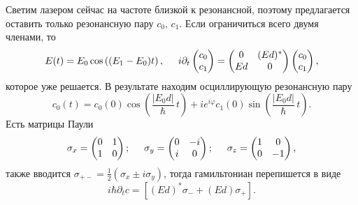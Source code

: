 Светим лазером сейчас на частоте близкой к резонансной, поэтому предлагается оставить только резонансную пару $c_0, \, c_1$.  Если ограничиться всего двумя членами, то
\begin{equation*}
    E(t) = E_0 \cos \left(
        (E_1-E_0) t
    \right),
    \hspace{5 mm} 
    i \partial_t \begin{pmatrix}
        c_0 \\ c_1
    \end{pmatrix} = 
    \begin{pmatrix}
        0 & (Ed)^* \\
        Ed & 0
    \end{pmatrix}
    \begin{pmatrix}
        c_0 \\ c_1
    \end{pmatrix},
\end{equation*}
которое уже решается. В результате находим осциллирующую резонансную пару
\begin{equation*}
        c_0 (t) = c_0 (0) \cos\left(
            \frac{|E_0 d|}{\hbar} \, t
        \right) + i e^{i \varphi} c_1 (0) \sin \left(
            \frac{|E_0 d|}{\hbar} \, t
        \right).
\end{equation*}
Есть матрицы Паули
\begin{equation*}
    \sigma_x = \begin{pmatrix} 0 & 1 \\ 1 & 0 \\ \end{pmatrix};
    \hspace{5 mm} 
    \sigma_y = \begin{pmatrix} 0 & -i\\ i & 0 \\ \end{pmatrix};
    \hspace{5 mm} 
    \sigma_z = \begin{pmatrix} 1 & 0 \\ 0 & -1 \\ \end{pmatrix},
\end{equation*}
 также вводится $\sigma_{+-} = \frac{1}{2} \left(
    \sigma_x \pm i \sigma_y
 \right)$, тогда гамильтониан перепишется в виде
 \begin{equation*}
     i \hbar \partial_t c = \left[
        (Ed)^* \sigma_- + (Ed) \sigma_+
     \right].
 \end{equation*}


